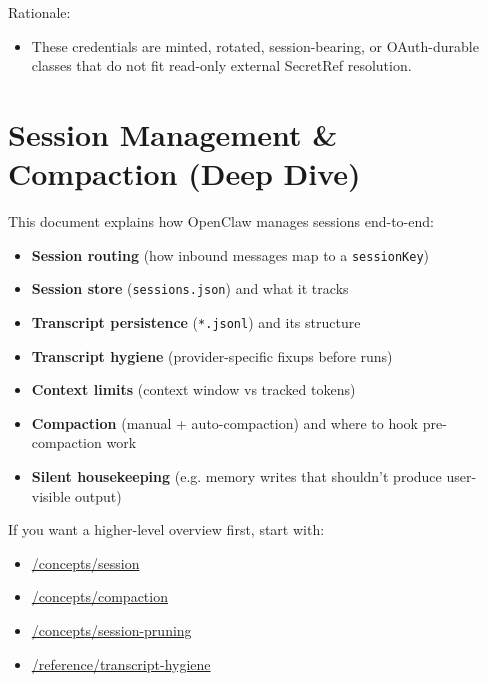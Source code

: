 Rationale:

\begin{itemize}
  \item These credentials are minted, rotated, session-bearing, or OAuth-durable classes that do not fit read-only external SecretRef resolution.
\end{itemize}



\clearpage

\section{Session Management \& Compaction (Deep Dive)}


This document explains how OpenClaw manages sessions end-to-end:

\begin{itemize}
  \item \textbf{Session routing} (how inbound messages map to a \texttt{sessionKey})
  \item \textbf{Session store} (\texttt{sessions.json}) and what it tracks
  \item \textbf{Transcript persistence} (\texttt{*.jsonl}) and its structure
  \item \textbf{Transcript hygiene} (provider-specific fixups before runs)
  \item \textbf{Context limits} (context window vs tracked tokens)
  \item \textbf{Compaction} (manual + auto-compaction) and where to hook pre-compaction work
  \item \textbf{Silent housekeeping} (e.g. memory writes that shouldn’t produce user-visible output)
\end{itemize}


If you want a higher-level overview first, start with:

\begin{itemize}
  \item \href{/concepts/session}{/concepts/session}
  \item \href{/concepts/compaction}{/concepts/compaction}
  \item \href{/concepts/session-pruning}{/concepts/session-pruning}
  \item \href{/reference/transcript-hygiene}{/reference/transcript-hygiene}
\end{itemize}


\hrulefill


